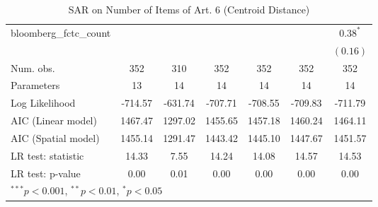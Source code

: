 \begin{table}[!h]
\begin{center}
\begin{tabular}{l c c c c c c }
bloomberg\_fctc\_count  &              &              &              &              &              & $0.38^{*}$   \\
                        &              &              &              &              &              & $(0.16)$     \\
\midrule
Num. obs.               & 352          & 310          & 352          & 352          & 352          & 352          \\
Parameters              & 13           & 14           & 14           & 14           & 14           & 14           \\
Log Likelihood          & -714.57      & -631.74      & -707.71      & -708.55      & -709.83      & -711.79      \\
AIC (Linear model)      & 1467.47      & 1297.02      & 1455.65      & 1457.18      & 1460.24      & 1464.11      \\
AIC (Spatial model)     & 1455.14      & 1291.47      & 1443.42      & 1445.10      & 1447.67      & 1451.57      \\
LR test: statistic      & 14.33        & 7.55         & 14.24        & 14.08        & 14.57        & 14.53        \\
LR test: p-value        & 0.00         & 0.01         & 0.00         & 0.00         & 0.00         & 0.00         \\
\bottomrule
\multicolumn{7}{l}{\scriptsize{$^{***}p<0.001$, $^{**}p<0.01$, $^*p<0.05$}}
\end{tabular}
\caption{SAR on Number of Items of Art. 6 (Centroid Distance)}
\label{table:coefficients}
\end{center}
\end{table}
